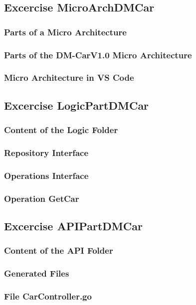 \subsection{Excercise MicroArchDMCar}
\subsubsection*{Parts of a Micro Architecture}


\subsubsection*{Parts of the DM-CarV1.0 Micro Architecture}

\subsubsection*{Micro Architecture in VS Code}

\subsection{Excercise LogicPartDMCar}
\subsubsection*{Content of the Logic Folder}
\subsubsection*{Repository Interface}
\subsubsection*{Operations Interface}
\subsubsection*{Operation GetCar}


\subsection{Excercise APIPartDMCar}
\subsubsection*{Content of the API Folder}
\subsubsection*{Generated Files}
\subsubsection*{File CarController.go}
